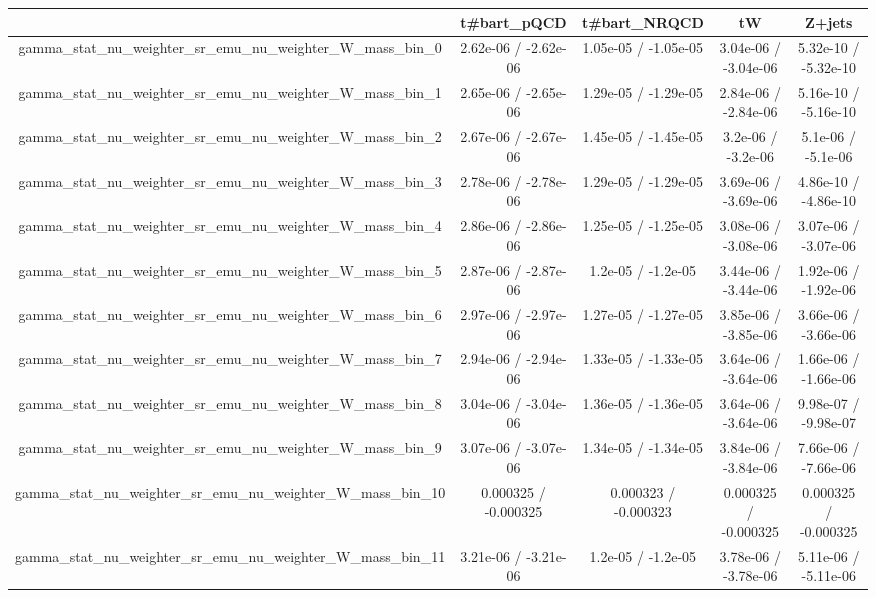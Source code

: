 \documentclass[10pt]{article}
\begin{document}
\begin{table}[htbp]
\begin{center}
\begin{tabular}{|c|c|c|c|c|}
\hline 
      & t#bar{t}_{pQCD}      & t#bar{t}_{NRQCD}      & tW      & Z+jets \\ 
\hline 
  gamma_stat_nu_weighter_sr_emu_nu_weighter_W_mass_bin_0 & 2.62e-06 / -2.62e-06 & 1.05e-05 / -1.05e-05 & 3.04e-06 / -3.04e-06 & 5.32e-10 / -5.32e-10 \\ 
  gamma_stat_nu_weighter_sr_emu_nu_weighter_W_mass_bin_1 & 2.65e-06 / -2.65e-06 & 1.29e-05 / -1.29e-05 & 2.84e-06 / -2.84e-06 & 5.16e-10 / -5.16e-10 \\ 
  gamma_stat_nu_weighter_sr_emu_nu_weighter_W_mass_bin_2 & 2.67e-06 / -2.67e-06 & 1.45e-05 / -1.45e-05 & 3.2e-06 / -3.2e-06 & 5.1e-06 / -5.1e-06 \\ 
  gamma_stat_nu_weighter_sr_emu_nu_weighter_W_mass_bin_3 & 2.78e-06 / -2.78e-06 & 1.29e-05 / -1.29e-05 & 3.69e-06 / -3.69e-06 & 4.86e-10 / -4.86e-10 \\ 
  gamma_stat_nu_weighter_sr_emu_nu_weighter_W_mass_bin_4 & 2.86e-06 / -2.86e-06 & 1.25e-05 / -1.25e-05 & 3.08e-06 / -3.08e-06 & 3.07e-06 / -3.07e-06 \\ 
  gamma_stat_nu_weighter_sr_emu_nu_weighter_W_mass_bin_5 & 2.87e-06 / -2.87e-06 & 1.2e-05 / -1.2e-05 & 3.44e-06 / -3.44e-06 & 1.92e-06 / -1.92e-06 \\ 
  gamma_stat_nu_weighter_sr_emu_nu_weighter_W_mass_bin_6 & 2.97e-06 / -2.97e-06 & 1.27e-05 / -1.27e-05 & 3.85e-06 / -3.85e-06 & 3.66e-06 / -3.66e-06 \\ 
  gamma_stat_nu_weighter_sr_emu_nu_weighter_W_mass_bin_7 & 2.94e-06 / -2.94e-06 & 1.33e-05 / -1.33e-05 & 3.64e-06 / -3.64e-06 & 1.66e-06 / -1.66e-06 \\ 
  gamma_stat_nu_weighter_sr_emu_nu_weighter_W_mass_bin_8 & 3.04e-06 / -3.04e-06 & 1.36e-05 / -1.36e-05 & 3.64e-06 / -3.64e-06 & 9.98e-07 / -9.98e-07 \\ 
  gamma_stat_nu_weighter_sr_emu_nu_weighter_W_mass_bin_9 & 3.07e-06 / -3.07e-06 & 1.34e-05 / -1.34e-05 & 3.84e-06 / -3.84e-06 & 7.66e-06 / -7.66e-06 \\ 
  gamma_stat_nu_weighter_sr_emu_nu_weighter_W_mass_bin_10 & 0.000325 / -0.000325 & 0.000323 / -0.000323 & 0.000325 / -0.000325 & 0.000325 / -0.000325 \\ 
  gamma_stat_nu_weighter_sr_emu_nu_weighter_W_mass_bin_11 & 3.21e-06 / -3.21e-06 & 1.2e-05 / -1.2e-05 & 3.78e-06 / -3.78e-06 & 5.11e-06 / -5.11e-06 \\ 

\end{tabular}
\end{center}
\end{table}
\end{document}
